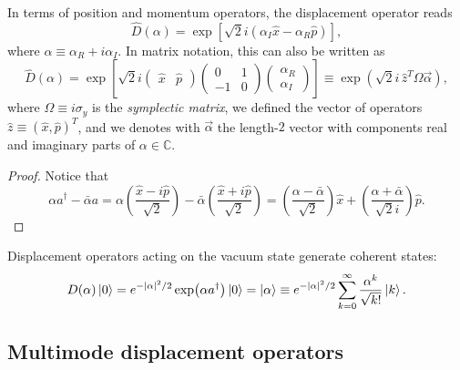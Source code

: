 \documentclass[a4paper]{report}
\newcommand{\CC}{\mathbb{C}}
\begin{document}
\begin{prop}
	In terms of position and momentum operators, the displacement operator reads
	\begin{equation}
		\hat D(\alpha)
		= \exp[\sqrt2 i(\alpha_I \hat x - \alpha_R \hat p)],
	\end{equation}
	where $\alpha\equiv \alpha_R+i\alpha_I$.
	In matrix notation, this can also be written as
	\begin{equation}
		\hat D(\alpha)
		= \exp\left[\sqrt2 i \begin{pmatrix}
			\hat x & \hat p
		\end{pmatrix}
		\begin{pmatrix}
			0 & 1 \\ -1 & 0
		\end{pmatrix}
		\begin{pmatrix}
			\alpha_R \\ \alpha_I
		\end{pmatrix}\right]
		\equiv \exp(\sqrt2 i\, \hat z^T \Omega \vec\alpha),
	\end{equation}
	where $\Omega\equiv i\sigma_y$ is the \emph{symplectic matrix}, we defined the vector of operators $\hat z\equiv (\hat x,\hat p)^T$, and we denotes with $\vec \alpha$ the length-$2$ vector with components real and imaginary parts of $\alpha\in\CC$.
\end{prop}
\begin{proof}
	Notice that
	\begin{equation}
		\alpha a^\dagger - \bar\alpha a
		= \alpha \left(\frac{\hat x-i\hat p}{\sqrt2}\right)
		- \bar\alpha\left(\frac{\hat x + i\hat p}{\sqrt2}\right)
		= \left(\frac{\alpha-\bar\alpha}{\sqrt2}\right) \hat x
		+ \left(\frac{\alpha+\bar\alpha}{\sqrt2 i}\right) \hat p.
	\end{equation}
\end{proof}

\begin{prop}
	Displacement operators acting on the vacuum state generate coherent states:
	\begin{equation}
		D(\alpha)\ket0 = e^{-|\alpha|^2/2}\exp(\alpha a^\dagger)\ket0
		= \ket\alpha
		\equiv e^{-|\alpha|^2/2} \sum_{k=0}^\infty
			\frac{\alpha^k}{\sqrt{k!}} \ket k.
	\end{equation}
\end{prop}

\subsection{Multimode displacement operators}
\end{document}
